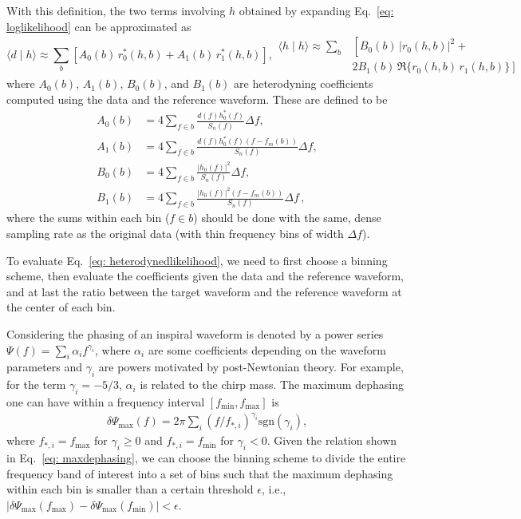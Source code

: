 \documentclass[twocolumn]{aastex631}
\begin{document}
With this definition, the two terms involving $h$ obtained by expanding
Eq.~\eqref{eq: loglikelihood} can be approximated as
\begin{subequations} \label{eq: heterodynedlikelihood}
\begin{equation}
    \langle d \mid h \rangle \approx \sum_b \left[ A_0(b)\, r^*_0(h,b) + A_1(b)\, r^*_1(h,b) \right] ,
\end{equation}
\begin{align}
    \langle h \mid h \rangle \approx \sum_b &\left[ B_0(b)\, |r_0(h,b)|^2 + \right. \nonumber \\
    &\left. 2 B_1(b)\, \Re\{r_0(h,b)\, r_1(h,b)\} \right] 
\end{align}
\end{subequations} 
where $A_0(b)$, $A_1(b)$, $B_0(b)$, and $B_1(b)$ are heterodyning coefficients
computed using the data and the reference waveform. These are defined to be
\begin{align}
    A_0(b) &= 4 \sum_{f \in b} \frac{d(f)h^*_0(f)}{S_n(f)} \Delta f, \\
    A_1(b) &= 4 \sum_{f \in b} \frac{d(f)h^*_0(f)(f-f_m(b))}{S_n(f)} \Delta f, \\
    B_0(b) &= 4 \sum_{f \in b} \frac{|h_0(f)|^2}{S_n(f)} \Delta f, \\
    B_1(b) &= 4 \sum_{f \in b} \frac{|h_0(f)|^2(f-f_m(b))}{S_n(f)} \Delta f\, ,
\end{align}
where the sums within each bin ($f \in b$) should be done with the same, dense
sampling rate as the original data (with thin frequency bins of width $\Delta f$).

To evaluate
Eq.~\eqref{eq: heterodynedlikelihood}, we need to first choose a binning
scheme, then evaluate the coefficients given the data and the reference
waveform, and at last the ratio between the target waveform and the reference
waveform at the center of each bin.

Considering the phasing of an inspiral waveform is denoted by a power series
$\Psi(f) = \sum_i \alpha_i f^{\gamma_i}$, where $\alpha_i$ are some
coefficients depending on the waveform parameters and $\gamma_i$ are powers
motivated by post-Newtonian theory. For example, for the term $\gamma_i =
-5/3$, $\alpha_i$ is related to the chirp mass. The maximum dephasing one can
have within a frequency interval $[f_{\textrm{min}},f_{\textrm{max}}]$ is 
\begin{align}
    \delta \Psi_{\textrm{max}}(f) = 2\pi \sum_{i} (f/f_{*,i})^{\gamma_i} \textrm{sgn}(\gamma_i),
\label{eq: maxdephasing}
\end{align}
where $f_{*,i} = f_{\textrm{max}}$ for $\gamma_i \geq 0$ and $f_{*,i} =
f_{\textrm{min}}$ for $\gamma_i<0$. Given the relation shown in Eq.~\eqref{eq:
maxdephasing}, we can choose the binning scheme to divide the entire frequency
band of interest into a set of bins such that the maximum dephasing within each
bin is smaller than a certain threshold $\epsilon$, i.e.,
$|\delta\Psi_{\textrm{max}}(f_{\textrm{max}}) -
\delta\Psi_{\textrm{max}}(f_{\textrm{min}})| < \epsilon$. 
\end{document}
